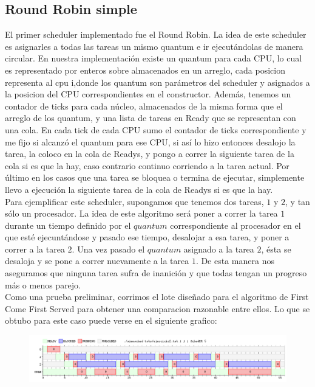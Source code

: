 \subsection{Round Robin simple}
El primer scheduler implementado fue el Round Robin. La idea de este scheduler es asignarles a todas las tareas un mismo quantum e ir ejecutándolas de manera circular. En nuestra implementación existe un quantum para cada CPU, lo cual es representado por enteros sobre almacenados en un arreglo, cada posicion representa al cpu i,donde los quantum son parámetros del scheduler y asignados a la posicion del CPU correspondientes en el constructor. Además, tenemos un contador de ticks para cada núcleo, almacenados de la misma forma que el arreglo de los quantum, y una lista de tareas en Ready que se representan con una cola. En cada tick de cada CPU sumo el contador de ticks correspondiente y me fijo si alcanzó el quantum para ese CPU, si así lo hizo entonces desalojo la tarea, la coloco en la cola de Readys, y pongo a correr la siguiente tarea de la cola si es que la hay, caso contrario continuo corriendo a la tarea actual. Por último en los casos que una tarea se bloquea o termina de ejecutar, simplemente llevo a ejecución la siguiente tarea de la cola de Readys si es que la hay.
\\
Para ejemplificar este scheduler, supongamos que tenemos dos tareas, $1$ y $2$, y tan sólo un procesador. La idea de este algoritmo será poner a correr la tarea $1$ durante un tiempo definido por el $quantum$ correspondiente al procesador en el que esté ejecuntándose y pasado ese tiempo, desalojar a esa tarea, y poner a correr a la tarea $2$. Una vez pasado el $quantum$ asignado a la tarea $2$, ésta se desaloja y se pone a correr nuevamente a la tarea $1$. De esta manera nos aseguramos que ninguna tarea sufra de inanición y que todas tengan un progreso más o menos parejo.
\\
Como una prueba preliminar, corrimos el lote diseñado para el algoritmo de First Come First Served para obtener una comparacion razonable entre ellos. Lo que se obtubo para este caso puede verse en el siguiente grafico:
\\
\begin{figure}[H]
  \centering
	\includegraphics[scale=0.45]{graficos/parte2/rr/1.png}
  \caption[Caption for LOF]{}
\end{figure}
